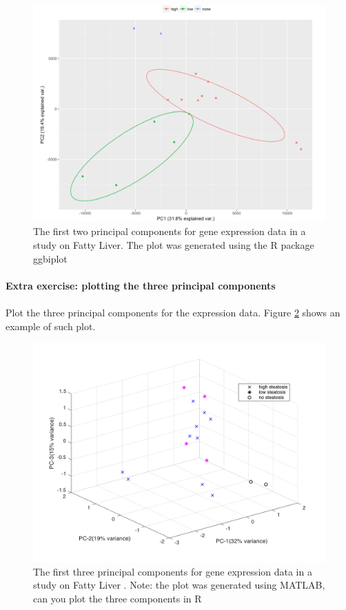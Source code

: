 \documentclass[11pt, oneside]{article}   	%
\begin{document}
\begin{figure}[!h]
	\includegraphics[width=\textwidth]{example2-first2components-fattyLiverData}
	\caption{The first two principal components for gene expression data in a study on Fatty Liver. The plot was generated using the R package ggbiplot \cite{Vu2016}}
	\label{fig:PCAFattyLiver}
\end{figure}




\paragraph{Extra exercise: plotting the three principal components}
\paragraph{}

Plot the three principal components for the expression data.
Figure \ref{fig:example2-PCA-3D} shows an example of such plot.

\begin{figure}[!h]
	\includegraphics[width=\textwidth]{example2-PCA-3D}
	\caption{The first three principal components for gene expression data in a study on Fatty Liver \cite{Wruck2015}. Note: the plot was generated using MATLAB, can you plot the three components in R}
	\label{fig:example2-PCA-3D}
\end{figure}
\end{document}
